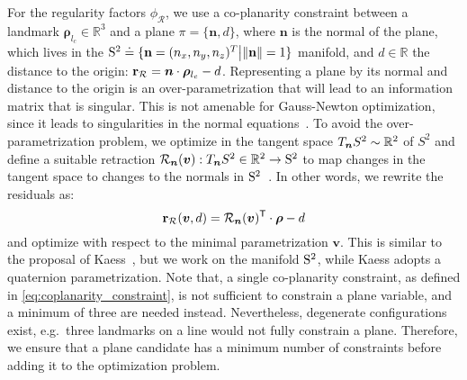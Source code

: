 For the regularity factors $\phi_{\mathcal{R}}$, we use a co-planarity constraint between a landmark $\bm\rho_{l_c}\in\mathbb{R}^3$ and a plane $\pi = \{\bm{n}, d\}$, where $\bm{n}$ is the normal of the plane, which lives in the $\mathrm{S}^2\doteq\{\mathbf{n} = (n_x, n_y, n_z)^T \big| \|\mathbf{n}\| = 1\}$ manifold, and $d\in\mathbb{R}$ the distance to the origin:
$\textstyle\mathbf{r}_{\mathcal{R}} = \bm{n} \cdot \bm{\rho}_{l_c} - d$.
Representing a plane by its normal and distance to the origin is an over-parametrization that will lead to an information matrix that is singular.
This is not amenable for Gauss-Newton optimization, since it leads to singularities in the normal equations~\cite{Kaess15icra}.
To avoid the over-parametrization problem, we optimize in the tangent space $T_{\boldsymbol{n}}S^2 \sim \mathbb{R}^{2}$ %
of $S^2$ and define a suitable retraction $\calR_{\Normal}(\bm{v}): T_{\Normal}S^2 \in \mathbb{R}^2 \rightarrow \Stwo$
to map changes in the tangent space to changes to the normals in $\mathrm{S}^2$~\cite{Forster17troOnmanifold}. %
In other words, we rewrite the residuals as:
\begin{equation}
  \residual_\mathcal{R}(\bm{v},d) = \calR_{\Normal}(\bm{v})^\transpose \cdot \landmark - d
  \label{eq:coplanarity_constraint}
\end{equation}
and optimize with respect to the minimal parametrization $\bm{v}$.
 This is similar to the proposal of Kaess~\cite{Kaess15icra}, but we work on the manifold $\mathrm{S}^2$, while Kaess adopts a quaternion parametrization.
Note that, a single co-planarity constraint, as defined in \cref{eq:coplanarity_constraint}, is not sufficient to constrain a plane variable, and a minimum of three are needed instead.
Nevertheless, degenerate configurations exist, e.g.~three landmarks on a line would not fully constrain a plane.
Therefore, we ensure that a plane candidate has a minimum number of constraints before adding it to the optimization problem.

